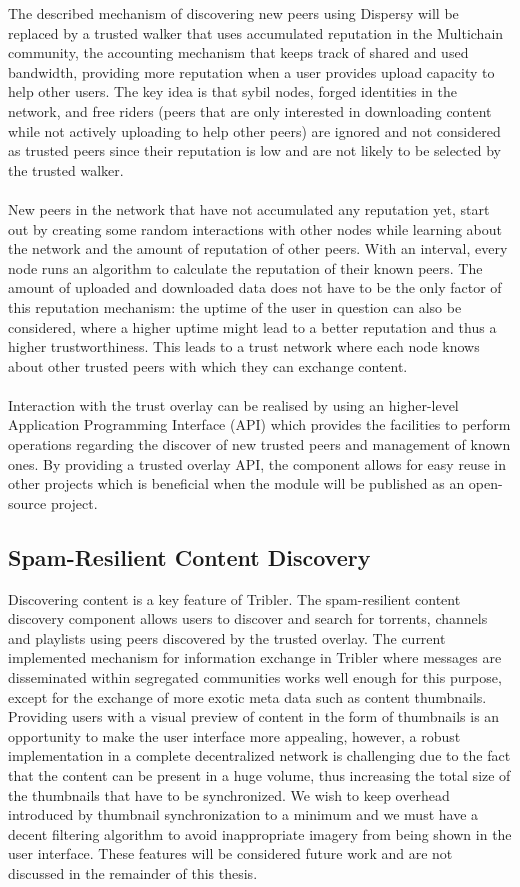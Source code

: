 The described mechanism of discovering new peers using Dispersy will be replaced by a trusted walker that uses accumulated reputation in the Multichain community, the accounting mechanism that keeps track of shared and used bandwidth, providing more reputation when a user provides upload capacity to help other users. The key idea is that sybil nodes, forged identities in the network, and free riders (peers that are only interested in downloading content while not actively uploading to help other peers) are ignored and not considered as trusted peers since their reputation is low and are not likely to be selected by the trusted walker.\\\\
New peers in the network that have not accumulated any reputation yet, start out by creating some random interactions with other nodes while learning about the network and the amount of reputation of other peers. With an interval, every node runs an algorithm to calculate the reputation of their known peers. The amount of uploaded and downloaded data does not have to be the only factor of this reputation mechanism: the uptime of the user in question can also be considered, where a higher uptime might lead to a better reputation and thus a higher trustworthiness. This leads to a trust network where each node knows about other trusted peers with which they can exchange content.\\\\
Interaction with the trust overlay can be realised by using an higher-level Application Programming Interface (API) which provides the facilities to perform operations regarding the discover of new trusted peers and management of known ones. By providing a trusted overlay API, the component allows for easy reuse in other projects which is beneficial when the module will be published as an open-source project.

\subsection{Spam-Resilient Content Discovery}
Discovering content is a key feature of Tribler. The spam-resilient content discovery component allows users to discover and search for torrents, channels and playlists using peers discovered by the trusted overlay. The current implemented mechanism for information exchange in Tribler where messages are disseminated within segregated communities works well enough for this purpose, except for the exchange of more exotic  meta data such as content thumbnails. Providing users with a visual preview of content in the form of thumbnails is an opportunity to make the user interface more appealing, however, a robust implementation in a complete decentralized network is challenging due to the fact that the content can be present in a huge volume, thus increasing the total size of the thumbnails that have to be synchronized. We wish to keep overhead introduced by thumbnail synchronization to a minimum and we must have a decent filtering algorithm to avoid inappropriate imagery from being shown in the user interface. These features will be considered future work and are not discussed in the remainder of this thesis.


